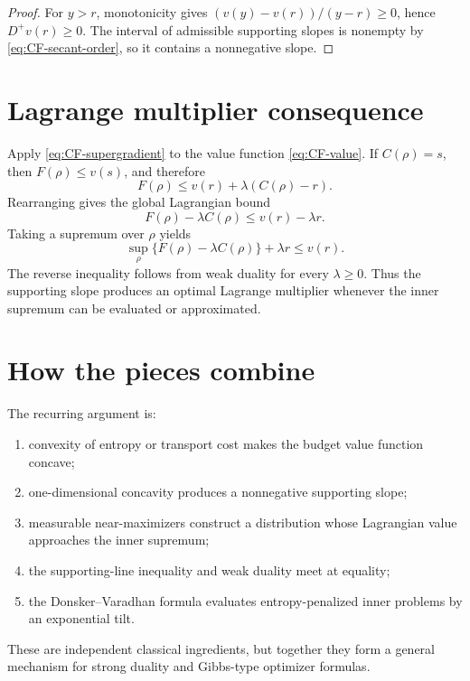 \begin{proof}
For $y>r$, monotonicity gives
$(v(y)-v(r))/(y-r)\ge0$, hence $D^+v(r)\ge0$.  The interval of admissible supporting
slopes is nonempty by \eqref{eq:CF-secant-order}, so it contains a nonnegative slope.
\end{proof}

\section{Lagrange multiplier consequence}
Apply \eqref{eq:CF-supergradient} to the value function \eqref{eq:CF-value}.  If
$C(\rho)=s$, then $F(\rho)\le v(s)$, and therefore
\[
 F(\rho)\le v(r)+\lambda(C(\rho)-r).
\]
Rearranging gives the global Lagrangian bound
\begin{equation}\label{eq:CF-lagrangian}
 F(\rho)-\lambda C(\rho)\le v(r)-\lambda r.
\end{equation}
Taking a supremum over $\rho$ yields
\begin{equation}\label{eq:CF-dual-value}
 \sup_\rho\{F(\rho)-\lambda C(\rho)\}+\lambda r\le v(r).
\end{equation}
The reverse inequality follows from weak duality for every $\lambda\ge0$.  Thus the
supporting slope produces an optimal Lagrange multiplier whenever the inner supremum
can be evaluated or approximated.

\section{How the pieces combine}
The recurring argument is:
\begin{enumerate}
\item convexity of entropy or transport cost makes the budget value function concave;
\item one-dimensional concavity produces a nonnegative supporting slope;
\item measurable near-maximizers construct a distribution whose Lagrangian value
approaches the inner supremum;
\item the supporting-line inequality and weak duality meet at equality;
\item the Donsker--Varadhan formula evaluates entropy-penalized inner problems by an
exponential tilt.
\end{enumerate}
These are independent classical ingredients, but together they form a general mechanism
for strong duality and Gibbs-type optimizer formulas.



